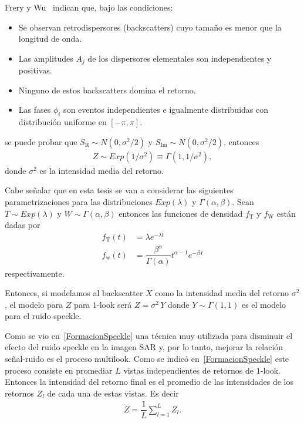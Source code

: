 Frery y Wu~\cite{FreryLibro2019} indican que, bajo las condiciones:
\begin{itemize}
	\item Se observan retrodispersores (backscatters) cuyo tamaño es menor que la longitud de onda.
	\item Las amplitudes $A_j$ de los dispersores elementales son independientes y positivas.
	\item Ninguno de estos backscatters domina el retorno. 
	\item Las fases $\phi_i$ son eventos independientes e igualmente distribuidas con distribución uniforme en $[-\pi,\pi]$.
\end{itemize}   
se puede probar que $S_{\text{R}} \sim N(0,\sigma^2/2)$ y $S_{\text{Im}} \sim N(0,\sigma^2/2)$, entonces
\begin{align}
\label{DistRetornoExp}
	Z \sim Exp(1/\sigma^2) \equiv \Gamma(1,1/\sigma^2),
\end{align}
donde $\sigma^2$ es la intensidad media del retorno.

Cabe señalar que en esta tesis se van a considerar las siguientes parametrizaciones para las distribuciones $Exp(\lambda)$ y $\Gamma(\alpha,\beta)$. Sean $T \sim Exp(\lambda)$ y $W \sim \Gamma(\alpha,\beta)$ entonces las funciones de densidad $f_{\text{T}}$ y $f_{\text{W}}$ están dadas por
\begin{align}
f_{\text{T}}(t)&=\lambda e^{-\lambda t}\label{DistExponencial}\\
f_{\text{w}}(t)&=\dfrac{\beta^{\alpha}}{\Gamma(\alpha)} t^{\alpha-1} e^{-\beta \, t}\label{DistGamma}
\end{align}
respectivamente.  

Entonces, si modelamos al backscatter $X$ como la intensidad media del retorno $\sigma^2$, el modelo para $Z$ para $1$-look será $Z=\sigma^2 \, Y$ donde $Y \sim \Gamma(1,1)$ es el modelo para el ruido speckle.
 
Como se vio en~\ref{FormacionSpeckle} una técnica muy utilizada para disminuir el efecto del ruido speckle en la imagen SAR y, por lo tanto, mejorar la relación señal-ruido es el proceso multilook. Como se indicó en~\ref{FormacionSpeckle} este proceso consiste en promediar $L$ vistas independientes de retornos de $1$-look. Entonces la intensidad del retorno final es el promedio de las intensidades de los retornos $Z_l$ de cada una de estas vistas. Es decir 
\begin{align}
Z=\dfrac{1}{L}\sum_{l=1}^L Z_l.
\end{align}

